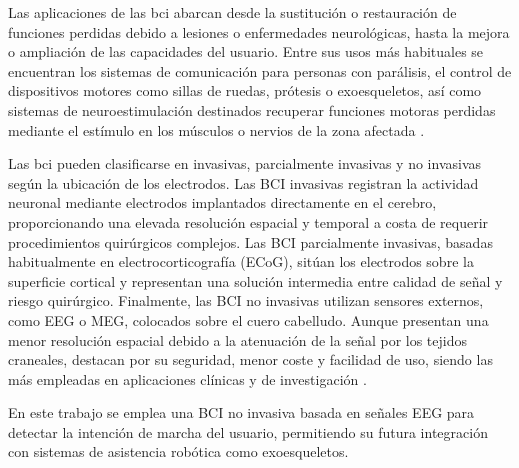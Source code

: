 Las aplicaciones de las \acrshort{bci} abarcan desde la sustitución o restauración de funciones perdidas debido a lesiones o enfermedades neurológicas, hasta la mejora o ampliación de las capacidades del usuario. Entre sus usos más habituales se encuentran los sistemas de comunicación para personas con parálisis, el control de dispositivos motores como sillas de ruedas, prótesis o exoesqueletos, así como sistemas de neuroestimulación destinados recuperar funciones motoras perdidas mediante el estímulo en los músculos o nervios de la zona afectada \cite{wolpaw_BraincomputerInterfaces2012,mcfarland_TherapeuticApplications2017,deng_ApplicationFuture2025}.

Las \acrshort{bci} pueden clasificarse en invasivas, parcialmente invasivas y no invasivas según la ubicación de los electrodos. Las BCI invasivas registran la actividad neuronal mediante electrodos implantados directamente en el cerebro, proporcionando una elevada resolución espacial y temporal a costa de requerir procedimientos quirúrgicos complejos. Las BCI parcialmente invasivas, basadas habitualmente en electrocorticografía (ECoG), sitúan los electrodos sobre la superficie cortical y representan una solución intermedia entre calidad de señal y riesgo quirúrgico. Finalmente, las BCI no invasivas utilizan sensores externos, como EEG o MEG, colocados sobre el cuero cabelludo. Aunque presentan una menor resolución espacial debido a la atenuación de la señal por los tejidos craneales, destacan por su seguridad, menor coste y facilidad de uso, siendo las más empleadas en aplicaciones clínicas y de investigación \cite{edelman_NonInvasiveBrainComputer2025,waldert_InvasiveVs2016,he_BrainComputer2020,wolpaw_BraincomputerInterfaces2012}.

En este trabajo se emplea una BCI no invasiva basada en señales EEG para detectar la intención de marcha del usuario, permitiendo su futura integración con sistemas de asistencia robótica como exoesqueletos.



